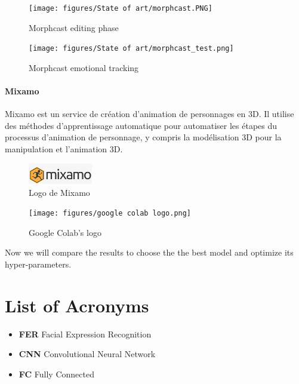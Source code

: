 \begin{figure}[H]
    \centering
    \texttt{[image: figures/State of art/morphcast.PNG]}
    \caption{Morphcast editing phase}
    \label{fig:morphcast}
    \cite{morphcast}
\end{figure}
\begin{figure}[H]
    \centering
    \texttt{[image: figures/State of art/morphcast\_test.png]}
    \caption{Morphcast emotional tracking}
    \label{fig:morphcast_test}
\end{figure}



\subsubsection*{Mixamo}
Mixamo est un service de création d'animation de personnages en 3D. Il utilise des méthodes d'apprentissage automatique pour
automatiser les étapes du processus d'animation de personnage, y compris la modélisation 3D pour la manipulation et l'animation 3D.
\begin{figure}[H]
    \centering
    \includegraphics[width=0.25\textwidth]{figure/mixamo.png}
    \caption{Logo de Mixamo}
    \label{fig:mixamo}
\end{figure}
\noindent



\begin{figure}[H]
    \centering
    \texttt{[image: figures/google colab logo.png]}
    \caption{Google Colab's logo}
    \label{googleColab}
\end{figure}
Now we will compare the results to choose the the best model and optimize its hyper-parameters.

\chapter*{\textbf{List of Acronyms}}
\begin{itemize}
\item \textbf{FER} Facial Expression Recognition
\item \textbf{CNN} Convolutional Neural Network
\item \textbf{FC} Fully Connected
\end{itemize}


